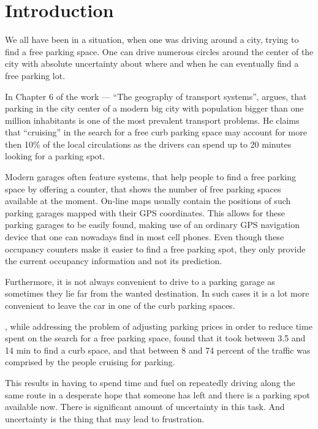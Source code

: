 \chapter{Introduction} %
\label{cha:introduction}

We all have been in a situation, when one was driving around a city,
trying to find a free parking space. One can drive numerous circles around
the center of the city with absolute uncertainty about where and when he
can eventually find a free parking lot.

In Chapter 6 of the work --- ``The geography of transport systems'',
\citet{rodrigue2013geography} argues, that parking in the city center of a
modern big city with population bigger than one million inhabitants is one of
the most prevalent transport problems. He claims that ``cruising'' in the
search for a free curb parking space may account for more then 10\% of the
local circulations as the drivers can spend up to 20 minutes looking for a
parking spot.

Modern garages often feature systems, that help people to find a free parking
space by offering a counter, that shows the number of free parking spaces
available at the moment. On-line maps usually contain the positions of such
parking garages mapped with their GPS coordinates. This allows for these
parking garages to be easily found, making use of an ordinary GPS navigation
device that one can nowadays find in most cell phones. Even though these
occupancy counters make it easier to find a free parking spot, they only
provide the current occupancy information and not its prediction.

Furthermore, it is not always convenient to drive to a parking garage as
sometimes they lie far from the wanted destination. In such cases it is a lot
more convenient to leave the car in one of the curb parking spaces.

\citet{shoup2006cruising}, while addressing the problem of adjusting parking
prices in order to reduce time spent on the search for a free parking space,
found that it took between 3.5 and 14 min to find a curb space, and that
between 8 and 74 percent of the traffic was comprised by the people cruising
for parking.

This results in having to spend time and fuel on repeatedly driving along the
same route in a desperate hope that someone has left and there is a parking
spot available now. There is significant amount of uncertainty in this task.
And uncertainty is the thing that may lead to frustration.

